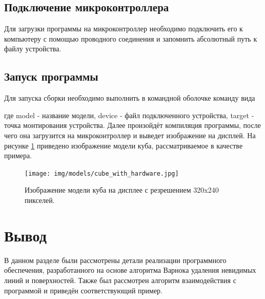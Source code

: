 \subsection{Подключение микроконтроллера}
Для загрузки программы на микроконтроллер необходимо подключить его к компьютеру с помощью проводного соединения и запомнить 
абсолютный путь к файлу устройства.

\subsection{Запуск программы}
Для запуска сборки необходимо выполнить в командной оболочке команду вида 

где model - название модели, device - файл подключенного устройства, target - точка монтирования устройства. 
Далее произойдёт компиляция программы, после чего она загрузится на микроконтроллер и выведет изображение на дисплей. 
На рисунке \ref{fig:cube} приведено изображение модели куба, рассматриваемое в качестве примера.

\begin{figure}[h]
	\centering
	\texttt{[image: img/models/cube\_with\_hardware.jpg]}
	\caption{Изображение модели куба на дисплее с резрешением 320x240 пикселей.}
	\label{fig:cube}
\end{figure} 





\section{Вывод}
В данном разделе были рассмотрены детали реализации программного обеспечения, разработанного на основе алгоритма Варнока удаления 
невидимых линий и поверхностей. Также был рассмотрен алгоритм взаимодействия с программой и приведён соответствующий пример.
